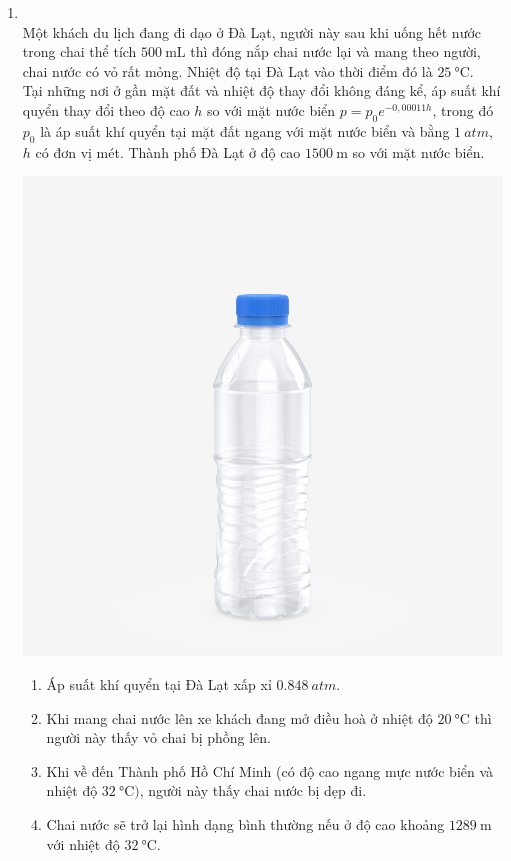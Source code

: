 \begin{enumerate}[label=\bfseries Câu \arabic*:, leftmargin=1.7cm]
	\item {}\\
	Một khách du lịch đang đi dạo ở Đà Lạt, người này sau khi uống hết nước trong chai thể tích $\SI{500}{\milli\liter}$ thì đóng nắp chai nước lại và mang theo người, chai nước có vỏ rất mỏng. Nhiệt độ tại Đà Lạt vào thời điểm đó là $\SI{25}{\celsius}$.\\
	Tại những nơi ở gần mặt đất và nhiệt độ thay đổi không đáng kể, áp suất khí quyển thay đổi theo độ cao $h$ so với mặt nước biển $p=p_0e^{-0,00011h}$, trong đó $p_0$ là áp suất khí quyển tại mặt đất ngang với mặt nước biển và bằng $\SI{1}{atm}$, $h$ có đơn vị mét. Thành phố Đà Lạt ở độ cao $\SI{1500}{\meter}$ so với mặt nước biển.
	\begin{center}
		\includegraphics[width=0.2\linewidth]{../figs/VN12-Y24-PH-SYL-012P-7}
	\end{center}
	\begin{enumerate}[label=\alph*)]
		\item Áp suất khí quyển tại Đà Lạt xấp xỉ $\SI{0.848}{atm}$.
		\item Khi mang chai nước lên xe khách đang mở điều hoà ở nhiệt độ $\SI{20}{\celsius}$ thì người này thấy vỏ chai bị phồng lên.
		\item Khi về đến Thành phố Hồ Chí Minh (có độ cao ngang mực nước biển và nhiệt độ $\SI{32}{\celsius})$, người này thấy chai nước bị dẹp đi.
		\item Chai nước sẽ trở lại hình dạng bình thường nếu ở độ cao khoảng $\SI{1289}{\meter}$ với nhiệt độ $\SI{32}{\celsius}$.
	\end{enumerate}
\end{enumerate}
